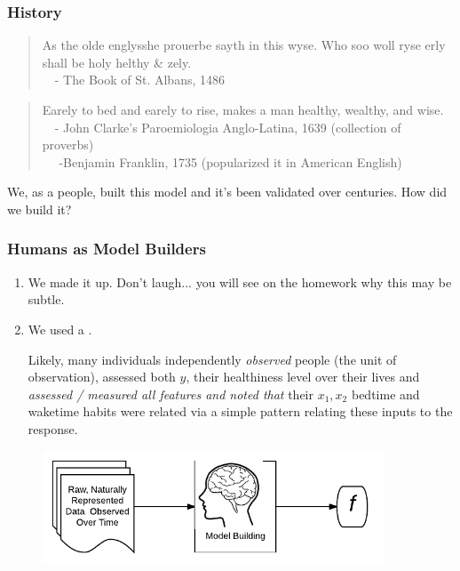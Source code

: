 \documentclass[slides]{beamer} %
\begin{document}
\begin{frame}\frametitle{History}

\begin{quotation}
As the olde englysshe prouerbe sayth in this wyse. Who soo woll ryse erly shall be holy helthy \& zely.\\
~~- The Book of St. Albans, 1486
\end{quotation}
	
\begin{quotation}
Earely to bed and earely to rise, makes a man healthy, wealthy, and wise. \\
~~- John Clarke's Paroemiologia Anglo-Latina, 1639 (collection of proverbs) \\
~~ -Benjamin Franklin, 1735 (popularized it in American English)
\end{quotation}

We, as a people, built this model and it's been validated over centuries. How did we build it?

\end{frame}

\begin{frame}\frametitle{Humans as Model Builders}

\begin{enumerate}
\item We made it up. Don't laugh... you will see on the homework why this may be subtle. \pause 
\item We used a . \\ \pause 

Likely, many individuals independently \textit{observed} people (the unit of observation), assessed both $y$, their healthiness level over their lives and \emph{assessed / measured all features and noted that} their $x_1, x_2$ bedtime and waketime habits were related via a simple pattern relating these inputs to the response. \pause 
\end{enumerate}

\begin{figure}
\centering
\includegraphics[width=4in]{human_learning}
\end{figure}
	
\end{frame}
\end{document}
